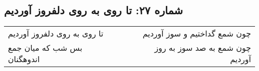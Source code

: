 \begin{center}
\section*{شماره ۲۷: تا روی به روی دلفروز آوردیم}
\label{sec:027}
\begin{longtable}{l p{0.5cm} r}
تا روی به روی دلفروز آوردیم
&&
چون شمع گداختیم و سوز آوردیم
\\
بس شب که میان جمع اندوهگنان
&&
چون شمع به صد سوز به روز آوردیم
\\
\end{longtable}
\end{center}
